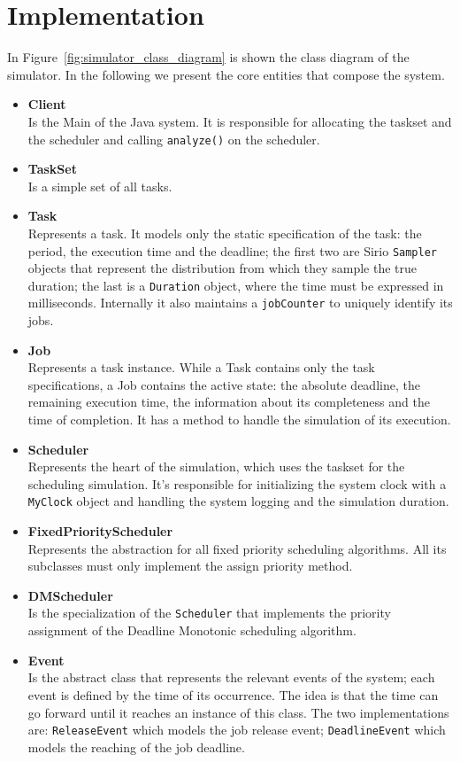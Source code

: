 \section{Implementation}
\label{sec:simulator_implementation}
In Figure~\ref{fig:simulator_class_diagram} is shown the class diagram of the simulator. In the following we present the core entities that compose the system.
\begin{itemize}
    \item\textbf{Client} \\
        Is the Main of the Java system. It is responsible for allocating the taskset and the scheduler and calling \texttt{analyze()} on the scheduler.
    \item\textbf{TaskSet} \\
        Is a simple set of all tasks.
    \item\textbf{Task} \\
        Represents a task. It models only the static specification of the task: the period, the execution time and the deadline; the first two are Sirio \texttt{Sampler} objects that represent the distribution from which they sample the true duration; the last is a \texttt{Duration} object, where the time must be expressed in milliseconds. Internally it also maintains a \texttt{jobCounter} to uniquely identify its jobs.
    \item\textbf{Job} \\
        Represents a task instance. While a Task contains only the task specifications, a Job contains the active state: the absolute deadline, the remaining execution time, the information about its completeness and the time of completion. It has a method to handle the simulation of its execution.
    \item\textbf{Scheduler} \\
        Represents the heart of the simulation, which uses the taskset for the scheduling simulation. It's responsible for initializing the system clock with a \texttt{MyClock} object and handling the system logging and the simulation duration.
    \item\textbf{FixedPriorityScheduler} \\
        Represents the abstraction for all fixed priority scheduling algorithms. All its subclasses must only implement the assign priority method.
    \item\textbf{DMScheduler} \\
        Is the specialization of the \texttt{Scheduler} that implements the priority assignment of the Deadline Monotonic scheduling algorithm.
    \item\textbf{Event} \\
        Is the abstract class that represents the relevant events of the system; each event is defined by the time of its occurrence. The idea is that the time can go forward until it reaches an instance of this class. The two implementations are: \texttt{ReleaseEvent} which models the job release event; \texttt{DeadlineEvent} which models the reaching of the job deadline.
\end{itemize}

